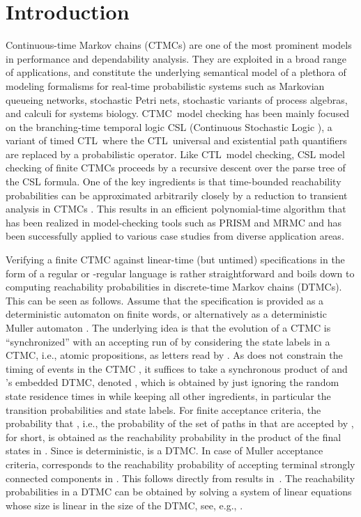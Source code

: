 \documentclass{LMCS}
\newcommand{\<}{\langle}
\renewcommand{\>}{\rangle}
\newcommand{\CTL}{\textsc{CTL}}
\newcommand{\CTMC}{\textsc{{CTMC}}}
\begin{document}
\maketitle
\vfill


\section{Introduction}

Continuous-time Markov chains (\CTMC s) are one of the most prominent models
in performance and dependability analysis.
They are exploited in a broad range of applications, and constitute the underlying
semantical model of a plethora of modeling formalisms for real-time probabilistic
systems such as Markovian queueing networks, stochastic Petri nets, stochastic
variants of process algebras, and calculi for systems biology.
\CTMC\ model checking has been mainly focused on the branching-time temporal
logic CSL (Continuous Stochastic Logic \cite{ASSB00,BHHK03}), a variant of timed
\CTL\ where the \CTL\ universal and existential path quantifiers are replaced by a
probabilistic operator.
Like \CTL\ model checking, CSL model checking of finite CTMCs proceeds by a
recursive descent over the parse tree of the CSL formula.
One of the key ingredients is that time-bounded reachability probabilities can be
approximated arbitrarily closely by a reduction to transient analysis in \CTMC s
\cite{BHHK03}.
This results in an efficient polynomial-time algorithm that has been realized in
model-checking tools such as PRISM \cite{HKNP06} and MRMC \cite{KHHJZ09} and
has been successfully applied to various case studies from diverse application areas.

Verifying a finite CTMC  against linear-time (but untimed) specifications
in the form of a regular or -regular language is rather straightforward
and boils down to computing reachability probabilities in discrete-time Markov
chains (DTMCs).
This can be seen as follows.
Assume that the specification is provided as a deterministic automaton 
on finite words, or alternatively as a deterministic Muller automaton .
The underlying idea is that the evolution of a CTMC is ``synchronized'' with an
accepting run of  by considering the state labels in a CTMC, i.e., atomic
propositions, as letters read by .
As  does not constrain the timing of events in the CTMC , it
suffices to take a synchronous product of  and 's embedded
DTMC, denoted , which is obtained by just ignoring the random
state residence times in  while keeping all other ingredients, in particular
the transition probabilities and state labels.
For finite acceptance criteria, the probability that , i.e., the
probability of the set of paths in  that are accepted by ,
 for short, is obtained as the reachability probability in
the product  of the final states in .
Since  is deterministic,  is a DTMC.
In case of Muller acceptance criteria,  corresponds
to the reachability probability of accepting terminal strongly connected components
in .  This follows directly from results in~\cite{CY95}.
The reachability probabilities in a DTMC can be obtained by solving a system of linear
equations whose size is linear in the size of the DTMC, see, e.g., \cite{HJ94}.
\end{document}
